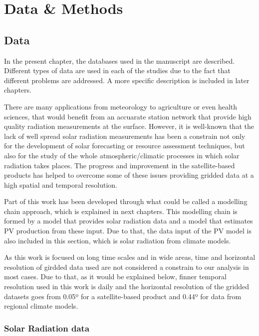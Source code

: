 \part{Data \& Methods\label{cha:datamethods}}

  
\chapter{Data\label{cha:Data}}

  In the present chapter, the databases used in the manuscript are described. Different types of data are used in each of the studies due to the fact that different problems are addressed. A more specific description is included in later chapters.

  There are many applications from meteorology to agriculture or even health sciences, that would benefit from an accuarate station network that provide high quality radiation measurements at the surface. However, it is well-known that the lack of  well spread solar radiation measurements has been a constrain not only for the development of solar forecasting or resource assessment techniques, but also for the study of the whole atmospheric/climatic processes in which solar radiation takes places. The progress and improvement in the satellite-based products has helped to overcome some of these issues providing gridded data at a high spatial and temporal resolution.

  Part of this work has been developed through what could be called a modelling chain approach, which is explained in next chapters. This modelling chain is formed by a model that provides solar radiation data and a model that estimates PV production from these input. Due to that, the data input of the PV model is also included in this section, which is solar radiation from climate models.

As this work is focused on long time scales and in wide areas, time and horizontal resolution of girdded data used are not considered a constrain to our analysis in most cases. Due to that, as it would be explained below, finner temporal resolution used in this work is daily and the horizontal resolution of the gridded datasets goes from 0.05º for a satellite-based product and 0.44º for data from regional climate models.    
\section{Solar Radiation data}

